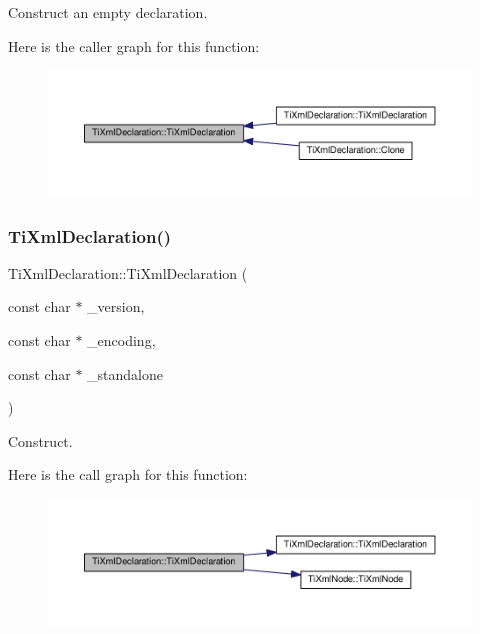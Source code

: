 Construct an empty declaration. 

Here is the caller graph for this function\+:
\nopagebreak
\begin{figure}[H]
\begin{center}
\leavevmode
\includegraphics[width=350pt]{class_ti_xml_declaration_aa0484d059bea0ea1acb47c9094382d79_icgraph}
\end{center}
\end{figure}
\mbox{\label{class_ti_xml_declaration_a3b618d1c30c25e4b7a71f31a595ee298}} 
\subsubsection{\texorpdfstring{Ti\+Xml\+Declaration()}{TiXmlDeclaration()}\hspace{0.1cm}{\footnotesize\ttfamily [2/3]}}
{\footnotesize\ttfamily Ti\+Xml\+Declaration\+::\+Ti\+Xml\+Declaration (\begin{DoxyParamCaption}\item[{const char $\ast$}]{\+\_\+version,  }\item[{const char $\ast$}]{\+\_\+encoding,  }\item[{const char $\ast$}]{\+\_\+standalone }\end{DoxyParamCaption})}



Construct. 

Here is the call graph for this function\+:
\nopagebreak
\begin{figure}[H]
\begin{center}
\leavevmode
\includegraphics[width=350pt]{class_ti_xml_declaration_a3b618d1c30c25e4b7a71f31a595ee298_cgraph}
\end{center}
\end{figure}
\mbox{\label{class_ti_xml_declaration_a58ac9042c342f7845c8491da0bb091e8}} 
